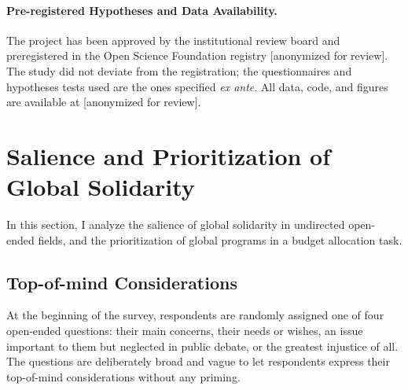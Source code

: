 \documentclass[12pt,english]{article}
\begin{document}
\begin{bibunit}
\paragraph{Pre-registered Hypotheses and Data Availability.}
The project has been approved by the institutional review board and preregistered in the Open Science Foundation registry [anonymized for review]. The study did not deviate from the registration; the questionnaires and hypotheses tests used are the ones specified \textit{ex ante}. All data, code, and figures are available at [anonymized for review].

\section{Salience and Prioritization of Global Solidarity\label{sec:salience}}

In this section, I analyze the salience of global solidarity in undirected open-ended fields, and the prioritization of global programs in a budget allocation task.

\subsection{Top-of-mind Considerations}\label{subsec:considerations}

At the beginning of the survey, respondents are randomly assigned one of four open-ended questions: their main concerns, their needs or wishes, an issue important to them but neglected in public debate, or the greatest injustice of all. The questions are deliberately broad and vague to let respondents express their top-of-mind considerations without any priming.


\end{bibunit}
\end{document}

